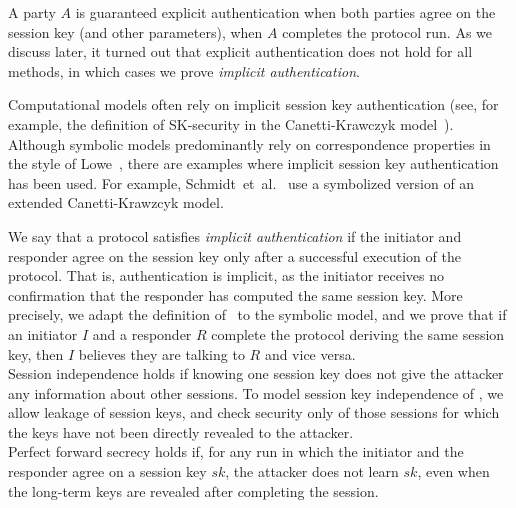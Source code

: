 A party $A$ is guaranteed explicit authentication when both parties agree
on the session key (and other parameters), when $A$ completes the protocol
run.
%
As we discuss later, it turned out that explicit authentication does not hold for all
\mEdhoc{} methods, in which cases we prove \emph{implicit authentication}.

Computational models often rely on implicit session key authentication
(see, for example, the definition of SK-security in the Canetti-Krawczyk
model~\cite{DBLP:conf/crypto/CanettiK02}).
%
Although symbolic models predominantly rely on correspondence properties
in the style of Lowe~\cite{DBLP:conf/csfw/Lowe97a}, there are examples where
implicit session key authentication has been used.
%
For example, Schmidt~et~al.~\cite{DBLP:conf/csfw/SchmidtMCB12} use a
symbolized version of an extended Canetti-Krawzcyk model.

%
We say that a protocol satisfies \emph{implicit authentication} if the
initiator and responder agree on the session key only after a successful
execution of the protocol.
%
That is, authentication is implicit, as the
initiator receives no confirmation that the responder has computed the same session key.
%
More precisely, we adapt the definition of~\cite{DBLP:journals/iacr/GuilhemFW19}
to the symbolic model, and we prove that if an initiator $I$ and a responder $R$
complete the protocol deriving the same session key, then $I$ believes they are
talking to $R$ and vice versa.\\

Session independence holds if knowing one session key does
not give the attacker any information about other sessions.  To model session
key independence of \mEdhoc, we allow leakage of session keys, and 
check security only of those sessions for which the keys have not been
directly revealed to the attacker.\\

Perfect forward
secrecy holds if, for any run in which the initiator and the responder
agree on a session key $sk$, the attacker does not learn $sk$, even when the
long-term keys are revealed after completing the session.


